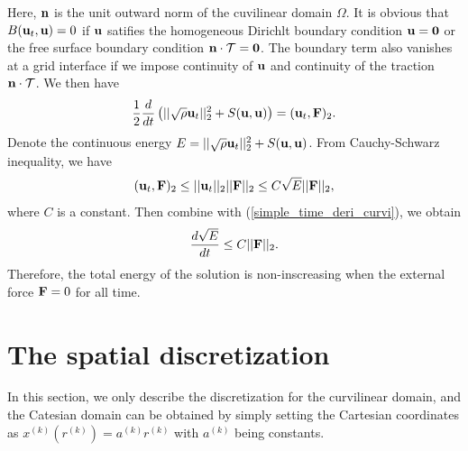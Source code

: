 \documentclass[a4paper]{article}
\begin{document}
Here, ${\bf n}$ is the unit outward norm of the cuvilinear domain $\Omega$. It is obvious that $B({\bf u}_t, {\bf u}) = 0$ if ${\bf u}$ satifies the homogeneous Dirichlt boundary condition ${\bf u} = {\bf 0}$ or the free surface boundary condition ${\bf n}\cdot\mathcal{T} = {\bf 0}$. The boundary term also vanishes at a grid interface if we impose continuity of ${\bf u}$ and continuity of the traction ${\bf n}\cdot\mathcal{T}$. We then have %
\begin{equation}\label{simple_time_deri_curvi}
\frac{1}{2}\frac{d}{dt} \left(||\sqrt{\rho}{\bf u}_t||_2^2 + S({\bf u},{\bf u})\right) =  ({\bf u}_t,{\bf F})_2.
\end{equation}
Denote the continuous energy ${E} = ||\sqrt{\rho}{\bf u}_t||_2^2 + S({\bf u},{\bf u})$. From Cauchy-Schwarz inequality, we have
\begin{equation*}
({\bf u}_t,{\bf F})_2\leq ||{\bf u}_t||_2 ||{\bf F}||_2\leq C\sqrt{E}||{\bf F}||_2,
\end{equation*}
where $C$ is a constant. Then combine with (\ref{simple_time_deri_curvi}), we obtain
\begin{equation*}
\frac{d\sqrt{E}}{dt} \leq C||{\bf F}||_2.
\end{equation*}
Therefore, the total energy of the solution is non-inscreasing when the external force ${\bf F} = 0$ for all time.

\section{The spatial discretization}

In this section, we only describe the discretization for the curvilinear domain, and the Catesian domain can be obtained by simply setting the Cartesian coordinates as $x^{(k)}(r^{(k)}) = a^{(k)}r^{(k)} $ with $a^{(k)}$ being constants.
\end{document}
